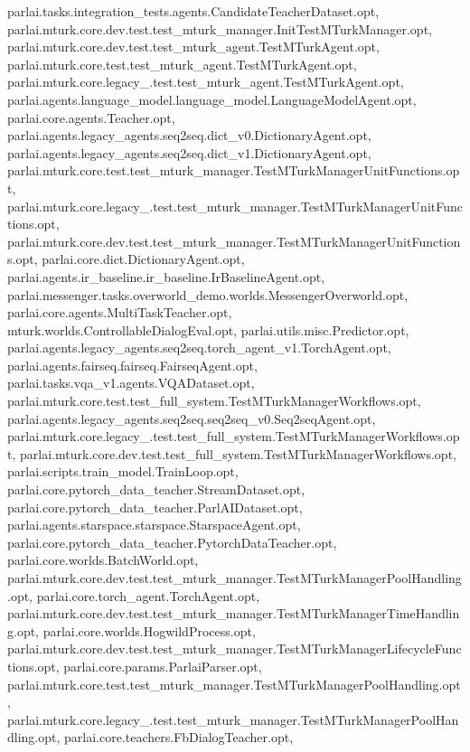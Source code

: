 parlai.\+tasks.\+integration\+\_\+tests.\+agents.\+Candidate\+Teacher\+Dataset.\+opt, parlai.\+mturk.\+core.\+dev.\+test.\+test\+\_\+mturk\+\_\+manager.\+Init\+Test\+M\+Turk\+Manager.\+opt, parlai.\+mturk.\+core.\+dev.\+test.\+test\+\_\+mturk\+\_\+agent.\+Test\+M\+Turk\+Agent.\+opt, parlai.\+mturk.\+core.\+test.\+test\+\_\+mturk\+\_\+agent.\+Test\+M\+Turk\+Agent.\+opt, parlai.\+mturk.\+core.\+legacy\+\_.\+test.\+test\+\_\+mturk\+\_\+agent.\+Test\+M\+Turk\+Agent.\+opt, parlai.\+agents.\+language\+\_\+model.\+language\+\_\+model.\+Language\+Model\+Agent.\+opt, parlai.\+core.\+agents.\+Teacher.\+opt, parlai.\+agents.\+legacy\+\_\+agents.\+seq2seq.\+dict\+\_\+v0.\+Dictionary\+Agent.\+opt, parlai.\+agents.\+legacy\+\_\+agents.\+seq2seq.\+dict\+\_\+v1.\+Dictionary\+Agent.\+opt, parlai.\+mturk.\+core.\+test.\+test\+\_\+mturk\+\_\+manager.\+Test\+M\+Turk\+Manager\+Unit\+Functions.\+opt, parlai.\+mturk.\+core.\+legacy\+\_.\+test.\+test\+\_\+mturk\+\_\+manager.\+Test\+M\+Turk\+Manager\+Unit\+Functions.\+opt, parlai.\+mturk.\+core.\+dev.\+test.\+test\+\_\+mturk\+\_\+manager.\+Test\+M\+Turk\+Manager\+Unit\+Functions.\+opt, parlai.\+core.\+dict.\+Dictionary\+Agent.\+opt, parlai.\+agents.\+ir\+\_\+baseline.\+ir\+\_\+baseline.\+Ir\+Baseline\+Agent.\+opt, parlai.\+messenger.\+tasks.\+overworld\+\_\+demo.\+worlds.\+Messenger\+Overworld.\+opt, parlai.\+core.\+agents.\+Multi\+Task\+Teacher.\+opt, mturk.\+worlds.\+Controllable\+Dialog\+Eval.\+opt, parlai.\+utils.\+misc.\+Predictor.\+opt, parlai.\+agents.\+legacy\+\_\+agents.\+seq2seq.\+torch\+\_\+agent\+\_\+v1.\+Torch\+Agent.\+opt, parlai.\+agents.\+fairseq.\+fairseq.\+Fairseq\+Agent.\+opt, parlai.\+tasks.\+vqa\+\_\+v1.\+agents.\+V\+Q\+A\+Dataset.\+opt, parlai.\+mturk.\+core.\+test.\+test\+\_\+full\+\_\+system.\+Test\+M\+Turk\+Manager\+Workflows.\+opt, parlai.\+agents.\+legacy\+\_\+agents.\+seq2seq.\+seq2seq\+\_\+v0.\+Seq2seq\+Agent.\+opt, parlai.\+mturk.\+core.\+legacy\+\_.\+test.\+test\+\_\+full\+\_\+system.\+Test\+M\+Turk\+Manager\+Workflows.\+opt, parlai.\+mturk.\+core.\+dev.\+test.\+test\+\_\+full\+\_\+system.\+Test\+M\+Turk\+Manager\+Workflows.\+opt, parlai.\+scripts.\+train\+\_\+model.\+Train\+Loop.\+opt, parlai.\+core.\+pytorch\+\_\+data\+\_\+teacher.\+Stream\+Dataset.\+opt, parlai.\+core.\+pytorch\+\_\+data\+\_\+teacher.\+Parl\+A\+I\+Dataset.\+opt, parlai.\+agents.\+starspace.\+starspace.\+Starspace\+Agent.\+opt, parlai.\+core.\+pytorch\+\_\+data\+\_\+teacher.\+Pytorch\+Data\+Teacher.\+opt, parlai.\+core.\+worlds.\+Batch\+World.\+opt, parlai.\+mturk.\+core.\+dev.\+test.\+test\+\_\+mturk\+\_\+manager.\+Test\+M\+Turk\+Manager\+Pool\+Handling.\+opt, parlai.\+core.\+torch\+\_\+agent.\+Torch\+Agent.\+opt, parlai.\+mturk.\+core.\+dev.\+test.\+test\+\_\+mturk\+\_\+manager.\+Test\+M\+Turk\+Manager\+Time\+Handling.\+opt, parlai.\+core.\+worlds.\+Hogwild\+Process.\+opt, parlai.\+mturk.\+core.\+dev.\+test.\+test\+\_\+mturk\+\_\+manager.\+Test\+M\+Turk\+Manager\+Lifecycle\+Functions.\+opt, parlai.\+core.\+params.\+Parlai\+Parser.\+opt, parlai.\+mturk.\+core.\+test.\+test\+\_\+mturk\+\_\+manager.\+Test\+M\+Turk\+Manager\+Pool\+Handling.\+opt, parlai.\+mturk.\+core.\+legacy\+\_.\+test.\+test\+\_\+mturk\+\_\+manager.\+Test\+M\+Turk\+Manager\+Pool\+Handling.\+opt, parlai.\+core.\+teachers.\+Fb\+Dialog\+Teacher.\+opt, 